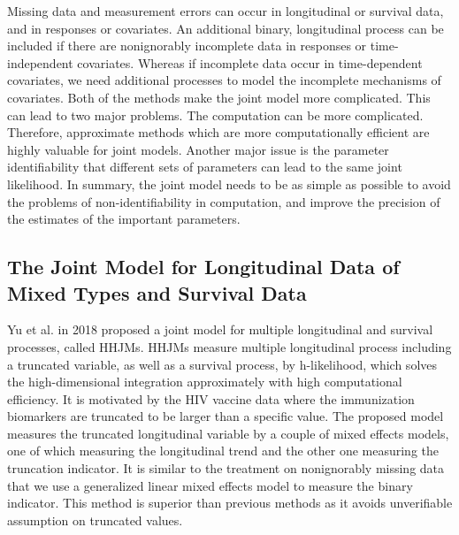Missing data and measurement errors can occur in longitudinal or survival data, and in responses or covariates.
An additional binary, longitudinal process can be included if there are nonignorably incomplete data in responses or time-independent covariates. Whereas if incomplete data occur in time-dependent covariates, we need additional processes to model the incomplete mechanisms of covariates. Both of the methods make the joint model more complicated. This can lead to two major problems. The computation can be more complicated. Therefore, approximate methods which are more computationally efficient are highly valuable for joint models. Another major issue is the parameter identifiability that different sets of parameters can lead to the same joint likelihood. In summary, the joint model needs to be as simple as possible to avoid the problems of non-identifiability in computation, and improve the precision of the estimates of the important parameters.
%




\subsection{The Joint Model for Longitudinal Data of Mixed Types and Survival Data}


Yu et al. in 2018 \cite{yu2018joint} proposed a joint model for multiple longitudinal and survival processes, called HHJMs. HHJMs measure multiple longitudinal process including a truncated variable, as well as a survival process, by h-likelihood, which solves the high-dimensional integration approximately with high computational efficiency. It is motivated by the HIV vaccine data where the immunization biomarkers are truncated to be larger than a specific value. The proposed model measures the truncated longitudinal variable by a couple of mixed effects models, one of which measuring the longitudinal trend and the other one measuring the truncation indicator. It is similar to the treatment on nonignorably missing data that we use a generalized linear mixed effects model to measure the binary indicator. This method is superior than previous methods as it avoids unverifiable assumption on truncated values.


